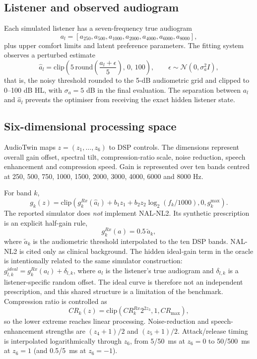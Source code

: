 \documentclass[preprint,12pt]{elsarticle}
\begin{document}
\subsection{Listener and observed audiogram}

Each simulated listener has a seven-frequency true audiogram
\begin{equation}
 a_l=[a_{250},a_{500},a_{1000},a_{2000},a_{4000},a_{6000},a_{8000}],
\end{equation}
plus upper comfort limits and latent preference parameters. The fitting system observes a perturbed estimate
\begin{equation}
    \hat a_l=\mathrm{clip}\!\left(5\,\mathrm{round}\!\left(\frac{a_l+\epsilon}{5}\right),\,0,\,100\right),\qquad \epsilon\sim\mathcal N(0,\sigma_a^2I),
    \label{eq:audiogram-noise}
\end{equation}
that is, the noisy threshold rounded to the 5-dB audiometric grid and clipped to 0--100 dB HL, with $\sigma_a=5$ dB in the final evaluation. The separation between $a_l$ and $\hat a_l$ prevents the optimiser from receiving the exact hidden listener state.

\subsection{Six-dimensional processing space}

AudioTwin maps $z=(z_1,\ldots,z_6)$ to DSP controls. The dimensions represent overall gain offset, spectral tilt, compression-ratio scale, noise reduction, speech enhancement and compression speed. Gain is represented over ten bands centred at 250, 500, 750, 1000, 1500, 2000, 3000, 4000, 6000 and 8000 Hz.

For band $k$,
\begin{equation}
 g_k(z)=\mathrm{clip}\left(g^{Rx}_k(\hat a_l)+b_1z_1+b_2z_2\log_2(f_k/1000),0,g^{\max}_k\right).
 \label{eq:gain}
\end{equation}
The reported simulator does \emph{not} implement NAL-NL2. Its synthetic prescription is an explicit half-gain rule,
\begin{equation}
 g^{Rx}_k(a)=0.5\,\tilde a_k,
 \label{eq:halfgain}
\end{equation}
where $\tilde a_k$ is the audiometric threshold interpolated to the ten DSP bands. NAL-NL2 is cited only as clinical background. The hidden ideal-gain term in the oracle is intentionally related to the same simulator construction: $g^{ideal}_{l,k}=g^{Rx}_k(a_l)+\delta_{l,k}$, where $a_l$ is the listener's true audiogram and $\delta_{l,k}$ is a listener-specific random offset. The ideal curve is therefore not an independent prescription, and this shared structure is a limitation of the benchmark.
Compression ratio is controlled as
\begin{equation}
 CR_k(z)=\mathrm{clip}\left(CR^{Rx}_k 2^{2z_3},1,CR_{\max}\right),
 \label{eq:compression}
\end{equation}
so the lower extreme reaches linear processing. Noise-reduction and speech-enhancement strengths are $(z_4+1)/2$ and $(z_5+1)/2$. Attack/release timing is interpolated logarithmically through $z_6$, from 5/50~ms at $z_6=0$ to 50/500~ms at $z_6=1$ (and 0.5/5~ms at $z_6=-1$).
\end{document}
